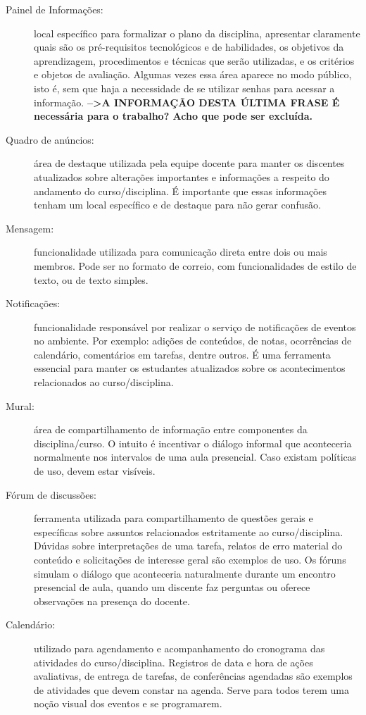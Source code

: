 \begin{description}
\item[Painel de Informações:] local específico para formalizar o plano da disciplina, apresentar claramente quais são os pré-requisitos tecnológicos e de habilidades, os objetivos da aprendizagem, procedimentos e técnicas que serão utilizadas, e os critérios e objetos de avaliação. Algumas vezes essa área aparece no modo público, isto é, sem que haja a necessidade de se utilizar senhas para acessar a informação. \textbf{-->A INFORMAÇÃO DESTA ÚLTIMA FRASE É necessária para o trabalho? Acho que pode ser excluída.}
\item[Quadro de anúncios:] área de destaque utilizada pela equipe docente para manter os discentes atualizados sobre alterações importantes e informações a respeito do andamento do curso/disciplina. É importante que essas informações tenham um local específico e de destaque para não gerar confusão.
\item[Mensagem:] funcionalidade utilizada para comunicação direta entre dois ou mais membros. Pode ser no formato de correio, com funcionalidades de estilo de texto, ou de texto simples.
\item[Notificações:] funcionalidade responsável por realizar o serviço de notificações de eventos no ambiente. Por exemplo: adições de conteúdos, de notas, ocorrências de calendário, comentários em tarefas, dentre outros. É uma ferramenta essencial para manter os estudantes atualizados sobre os acontecimentos relacionados ao curso/disciplina.
\item[Mural:] área de compartilhamento de informação entre componentes da disciplina/curso. O intuito é incentivar o diálogo informal que aconteceria normalmente nos intervalos de uma aula presencial. Caso existam políticas de uso, devem estar visíveis.
\item[Fórum de discussões:] ferramenta utilizada para compartilhamento de questões gerais e específicas sobre assuntos relacionados estritamente ao curso/disciplina. Dúvidas sobre interpretações de uma tarefa, relatos de erro material do conteúdo e solicitações de interesse geral são exemplos de uso. Os fóruns simulam o diálogo que aconteceria naturalmente durante um encontro presencial de aula, quando um discente faz perguntas ou oferece observações na presença do docente.
\item[Calendário:] utilizado para agendamento e acompanhamento do cronograma das atividades do curso/disciplina. Registros de data e hora de ações avaliativas, de entrega de tarefas, de conferências agendadas são exemplos de atividades que devem constar na agenda. Serve para todos terem uma noção visual dos eventos e se programarem.

\end{description}
